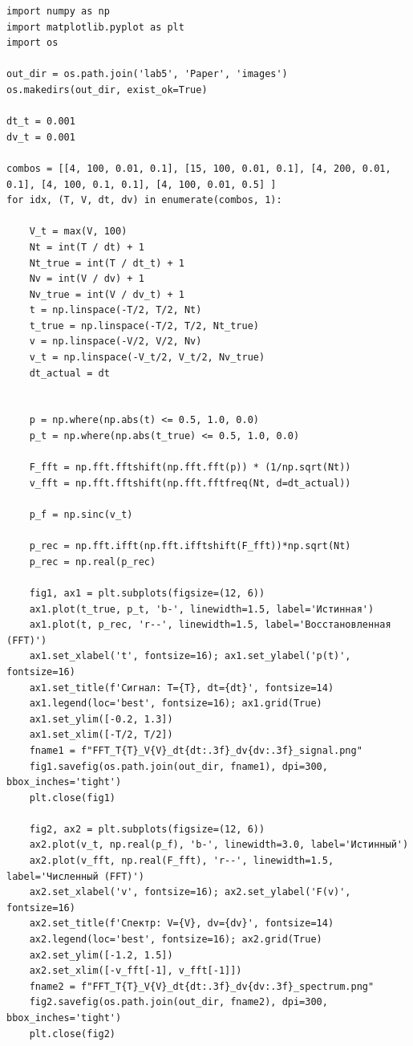 \documentclass[a4paper, 12pt]{article}
\begin{document}
\begin{lstlisting}[caption={Код для встроенного дискретного преобразования Фурье в первом пункте}]
import numpy as np
import matplotlib.pyplot as plt
import os

out_dir = os.path.join('lab5', 'Paper', 'images')
os.makedirs(out_dir, exist_ok=True)

dt_t = 0.001
dv_t = 0.001

combos = [[4, 100, 0.01, 0.1], [15, 100, 0.01, 0.1], [4, 200, 0.01, 0.1], [4, 100, 0.1, 0.1], [4, 100, 0.01, 0.5] ]
for idx, (T, V, dt, dv) in enumerate(combos, 1):

    V_t = max(V, 100)
    Nt = int(T / dt) + 1
    Nt_true = int(T / dt_t) + 1
    Nv = int(V / dv) + 1
    Nv_true = int(V / dv_t) + 1
    t = np.linspace(-T/2, T/2, Nt)
    t_true = np.linspace(-T/2, T/2, Nt_true)
    v = np.linspace(-V/2, V/2, Nv)
    v_t = np.linspace(-V_t/2, V_t/2, Nv_true)
    dt_actual = dt 
    

    p = np.where(np.abs(t) <= 0.5, 1.0, 0.0)
    p_t = np.where(np.abs(t_true) <= 0.5, 1.0, 0.0)

    F_fft = np.fft.fftshift(np.fft.fft(p)) * (1/np.sqrt(Nt))
    v_fft = np.fft.fftshift(np.fft.fftfreq(Nt, d=dt_actual))
    
    p_f = np.sinc(v_t)

    p_rec = np.fft.ifft(np.fft.ifftshift(F_fft))*np.sqrt(Nt)
    p_rec = np.real(p_rec)

    fig1, ax1 = plt.subplots(figsize=(12, 6))
    ax1.plot(t_true, p_t, 'b-', linewidth=1.5, label='Истинная')
    ax1.plot(t, p_rec, 'r--', linewidth=1.5, label='Восстановленная (FFT)')
    ax1.set_xlabel('t', fontsize=16); ax1.set_ylabel('p(t)', fontsize=16)
    ax1.set_title(f'Сигнал: T={T}, dt={dt}', fontsize=14)
    ax1.legend(loc='best', fontsize=16); ax1.grid(True)
    ax1.set_ylim([-0.2, 1.3])
    ax1.set_xlim([-T/2, T/2])
    fname1 = f"FFT_T{T}_V{V}_dt{dt:.3f}_dv{dv:.3f}_signal.png"
    fig1.savefig(os.path.join(out_dir, fname1), dpi=300, bbox_inches='tight')
    plt.close(fig1)

    fig2, ax2 = plt.subplots(figsize=(12, 6))
    ax2.plot(v_t, np.real(p_f), 'b-', linewidth=3.0, label='Истинный')
    ax2.plot(v_fft, np.real(F_fft), 'r--', linewidth=1.5, label='Численный (FFT)')
    ax2.set_xlabel('v', fontsize=16); ax2.set_ylabel('F(v)', fontsize=16)
    ax2.set_title(f'Спектр: V={V}, dv={dv}', fontsize=14)
    ax2.legend(loc='best', fontsize=16); ax2.grid(True)
    ax2.set_ylim([-1.2, 1.5])
    ax2.set_xlim([-v_fft[-1], v_fft[-1]])
    fname2 = f"FFT_T{T}_V{V}_dt{dt:.3f}_dv{dv:.3f}_spectrum.png"
    fig2.savefig(os.path.join(out_dir, fname2), dpi=300, bbox_inches='tight')
    plt.close(fig2)


\end{lstlisting}
\end{document}
